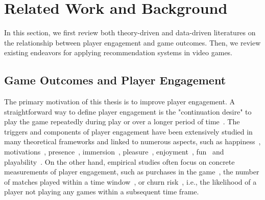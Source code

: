 \chapter{Related Work and Background} %

\label{chapter:relatework} %

In this section, we first review both theory-driven and data-driven literatures on the relationship between player engagement and game outcomes. Then, we review existing endeavors for applying recommendation systems in video games.

\section{Game Outcomes and Player Engagement}
The primary motivation of this thesis is to improve player engagement. A straightforward way to define player engagement is the "continuation desire" to play the game repeatedly during play or over a longer period of time~\cite{schoenau2011player}. The triggers and components of player engagement have been extensively studied in many theoretical frameworks and linked to numerous aspects, such as happiness~\cite{sweetser2005gameflow,flow1990psychology,chen2007flow}, motivations~\cite{przybylski2010motivational,ryan2006motivational,yee2006demographics,yee2006motivations,sherry2006video}, presence~\cite{lombard1997heart,tamborini2006role}, immersion~\cite{mcmahan2003immersion,brown2004grounded,jennett2008measuring,ermi2005fundamental}, pleasure~\cite{costello2009tool}, enjoyment~\cite{ravaja2007fun,klimmt2003dimensions,mekler2014systematic}, fun~\cite{koster2013theory} and playability~\cite{federoff2003improving,federoff2002heuristics,desurvire2004using,nacke2009playability}. On the other hand, empirical studies often focus on concrete measurements of player engagement, such as purchases in the game~\cite{xie2015predicting,sifa2015predicting}, the number of matches played within a time window~\cite{xue2017dynamic,weber2011modeling,}, or churn risk~\cite{hadiji2014predicting,harrison2012players}, i.e., the likelihood of a player not playing any games within a subsequent time frame.

